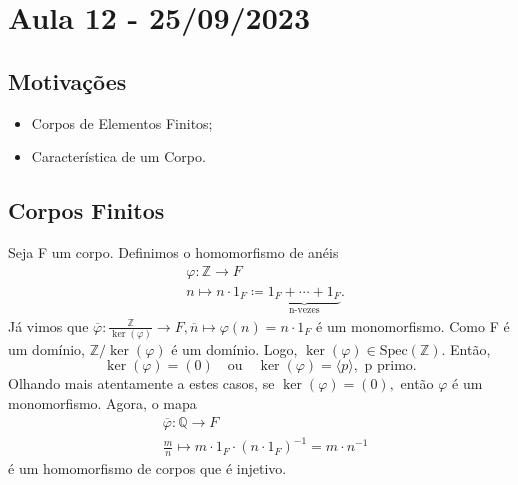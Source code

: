 \documentclass[AlgebraII/algebraII_notes.tex]{subfiles}
\begin{document}
\section{Aula 12 - 25/09/2023}
\subsection{Motivações}
\begin{itemize}
	\item Corpos de Elementos Finitos;
	\item Característica de um Corpo.
\end{itemize}
\subsection{Corpos Finitos}
Seja F um corpo. Definimos o homomorfismo de anéis
\begin{align*}
	 & \varphi :\mathbb{Z}\rightarrow F                                                      \\
	 & n\mapsto n \cdot 1_{F}\coloneqq \underbrace{1_{F} + \cdots + 1_{F}}_{\text{n-vezes}}.
\end{align*}
Já vimos que \(\overline{\varphi }:\frac{\mathbb{Z}}{\ker{(\varphi )}}\rightarrow F, \overline{n}\mapsto \varphi (n)=n \cdot 1_{F}\) é um monomorfismo. Como F é um
domínio, \(\mathbb{Z}/\ker{(\varphi )}\) é um domínio. Logo, \(\ker{(\varphi )}\in \mathrm{Spec}(\mathbb{Z}).\) Então,
\[
	\ker{(\varphi )} = (0)\quad\text{ou}\quad \ker{(\varphi )}=\langle p \rangle,\text{ p primo.}
\]
Olhando mais atentamente a estes casos, se \(\ker{(\varphi )} = (0),\) então \(\varphi \) é um monomorfismo. Agora,
o mapa
\begin{align*}
	 & \overline{\varphi }:\mathbb{Q}\rightarrow F                                  \\
	 & \frac{m}{n}\mapsto m \cdot 1_{F} \cdot (n \cdot 1_{F})^{-1} = m \cdot n^{-1}
\end{align*}
é um homomorfismo de corpos que é injetivo.
\end{document}
